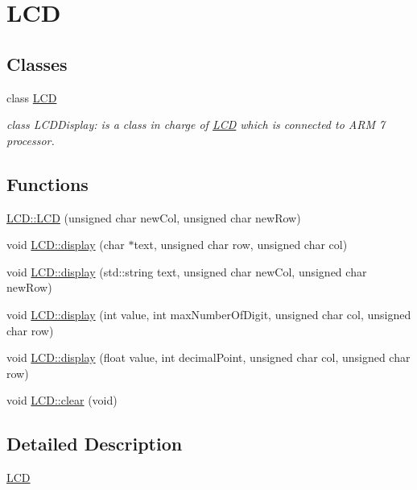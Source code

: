 \hypertarget{group__group4}{
\section{LCD}
\label{df/d74/group__group4}
}
\subsection*{Classes}
\begin{DoxyCompactItemize}
\item 
class \hyperlink{class_l_c_d}{LCD}
\begin{DoxyCompactList}\small\item\em class LCDDisplay: is a class in charge of \hyperlink{class_l_c_d}{LCD} which is connected to ARM 7 processor. \end{DoxyCompactList}\end{DoxyCompactItemize}
\subsection*{Functions}
\begin{DoxyCompactItemize}
\item 
\hyperlink{group__group4_ga32e550ea850f2061ca5981f6115b275f}{LCD::LCD} (unsigned char newCol, unsigned char newRow)
\item 
void \hyperlink{group__group4_ga445cd6497e7d4ff4d15826f3ca1ee648}{LCD::display} (char $\ast$text, unsigned char row, unsigned char col)
\item 
void \hyperlink{group__group4_ga9b2221e38e57d142d0c69e716195639d}{LCD::display} (std::string text, unsigned char newCol, unsigned char newRow)
\item 
void \hyperlink{group__group4_gac0d73080423795794990d2a22aafc51d}{LCD::display} (int value, int maxNumberOfDigit, unsigned char col, unsigned char row)
\item 
void \hyperlink{group__group4_ga18edbaed2656fbec0f6d544e4e50ae19}{LCD::display} (float value, int decimalPoint, unsigned char col, unsigned char row)
\item 
void \hyperlink{group__group4_gaca6cd9e401283d5fa4917d53260b3ba9}{LCD::clear} (void)
\end{DoxyCompactItemize}


\subsection{Detailed Description}
\hyperlink{class_l_c_d}{LCD} 

